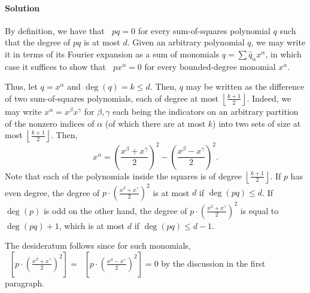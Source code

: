 \documentclass[11pt]{article}
\theoremstyle{definition}
\DeclareMathOperator{\pE}{\widetilde{\mathbb{E}}} %
\begin{document}
\paragraph{Solution}

By definition, we have that $\pE pq = 0$ for every sum-of-squares polynomial $q$ such that the degree of $pq$ is at most $d$. Given an arbitrary polynomial $q$, we may write it in terms of its Fourier expansion as a sum of monomials $q = \sum \widehat{q}_\alpha x^\alpha$, in which case it suffices to show that $\pE p x^\alpha = 0$ for every bounded-degree monomial $x^\alpha$.

Thus, let $q = x^\alpha$ and $\deg(q) = k \le d$. Then, $q$ may be written as the difference of two sum-of-squares polynomials, each of degree at most $\left\lfloor \frac{k+1}{2}\right\rfloor$. Indeed, we may write $x^\alpha = x^\beta x^\gamma$ for $\beta,\gamma$ each being the indicators on an arbitrary partition of the nonzero indices of $\alpha$ (of which there are at most $k$) into two sets of size at most $\left\lfloor \frac{k+1}{2}\right\rfloor$. Then,
\[ x^\alpha = \left( \frac{x^\beta + x^\gamma}{2} \right)^2 - \left( \frac{x^\beta - x^\gamma}{2} \right)^2. \]
Note that each of the polynomials inside the squares is of degree $\left \lfloor \frac{k+1}{2} \right \rfloor$. If $p$ has even degree, the degree of $p \cdot \left( \frac{x^\beta + x^\gamma}{2} \right)^2$ is at most $d$ if $\deg (p q) \le d$. If $\deg(p)$ is odd on the other hand, the degree of $p \cdot \left( \frac{x^\beta + x^\gamma}{2} \right)^2$ is equal to $\deg(pq) + 1$, which is at most $d$ if $\deg(p q) \le d-1$.

The desideratum follows since for such monomials, $\pE \left[ p \cdot \left( \frac{x^\beta+x^\gamma}{2} \right)^2 \right] = \pE \left[ p \cdot \left( \frac{x^\beta-x^\gamma}{2} \right)^2 \right] = 0$ by the discussion in the first paragraph.



\end{document}
